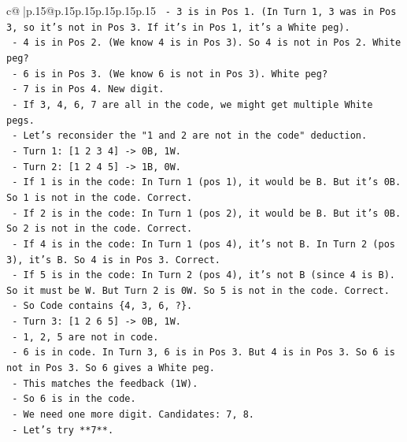 \documentclass{article}
\begin{document}
{\begin{supertabular}{c@{$\;$}|p{.15\linewidth}@{}p{.15\linewidth}p{.15\linewidth}p{.15\linewidth}p{.15\linewidth}p{.15\linewidth}}
{{{\texttt{            {-} 3 is in Pos 1. (In Turn 1, 3 was in Pos 3, so it's not in Pos 3. If it's in Pos 1, it's a White peg).} \\
\texttt{            {-} 4 is in Pos 2. (We know 4 is in Pos 3). So 4 is not in Pos 2. White peg?} \\
\texttt{            {-} 6 is in Pos 3. (We know 6 is not in Pos 3). White peg?} \\
\texttt{            {-} 7 is in Pos 4. New digit.} \\
\texttt{            {-} If 3, 4, 6, 7 are all in the code, we might get multiple White pegs.} \\
\texttt{            {-} Let's reconsider the "1 and 2 are not in the code" deduction.} \\
\texttt{              {-} Turn 1: {[}1 2 3 4{]} {-}> 0B, 1W.} \\
\texttt{              {-} Turn 2: {[}1 2 4 5{]} {-}> 1B, 0W.} \\
\texttt{              {-} If 1 is in the code: In Turn 1 (pos 1), it would be B. But it's 0B. So 1 is not in the code. Correct.} \\
\texttt{              {-} If 2 is in the code: In Turn 1 (pos 2), it would be B. But it's 0B. So 2 is not in the code. Correct.} \\
\texttt{              {-} If 4 is in the code: In Turn 1 (pos 4), it's not B. In Turn 2 (pos 3), it's B. So 4 is in Pos 3. Correct.} \\
\texttt{              {-} If 5 is in the code: In Turn 2 (pos 4), it's not B (since 4 is B). So it must be W. But Turn 2 is 0W. So 5 is not in the code. Correct.} \\
\texttt{              {-} So Code contains \{4, 3, 6, ?\}.} \\
\texttt{              {-} Turn 3: {[}1 2 6 5{]} {-}> 0B, 1W.} \\
\texttt{                {-} 1, 2, 5 are not in code.} \\
\texttt{                {-} 6 is in code. In Turn 3, 6 is in Pos 3. But 4 is in Pos 3. So 6 is not in Pos 3. So 6 gives a White peg.} \\
\texttt{                {-} This matches the feedback (1W).} \\
\texttt{                {-} So 6 is in the code.} \\
\texttt{              {-} We need one more digit. Candidates: 7, 8.} \\
\texttt{              {-} Let's try **7**.} \\
}}}
\end{supertabular}}
\end{document}
